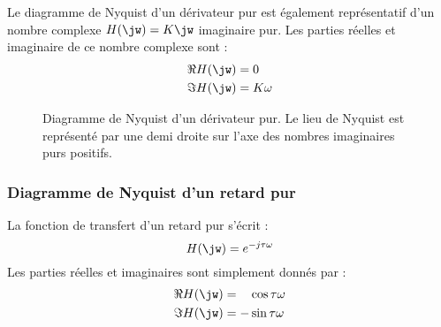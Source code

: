 Le diagramme de Nyquist d'un dérivateur pur est également représentatif d'un 
nombre complexe $H(\jw)=K\jw$ imaginaire pur. Les parties réelles et imaginaire
de ce nombre complexe sont :
\begin{align*}
    \Re{H(\jw)}&=0\\
    \Im{H(\jw)}&=K\omega
\end{align*}
\begin{figure}[!h]
\begin{center}
\end{center}
\caption{Diagramme de Nyquist d'un dérivateur pur. Le lieu de Nyquist 
         est représenté par une demi droite sur l'axe des nombres 
         imaginaires purs positifs.\label{fig-nyquist_3}}
\end{figure}

\newpage
\subsubsection{Diagramme de Nyquist d'un retard pur}

La fonction de transfert d'un retard pur s'écrit :
$$
H(\jw)=e^{-j\tau\omega}
$$
Les parties réelles et imaginaires sont simplement donnés par :
\begin{align*}
    \Re{H(\jw)}&=\hphantom{-}\cos{\tau\omega}\\
    \Im{H(\jw)}&=-\sin{\tau\omega}
\end{align*}

